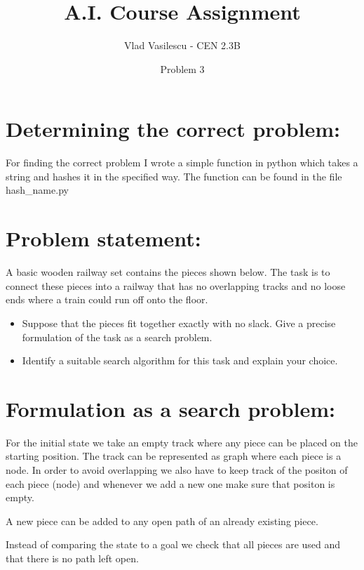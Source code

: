 \documentclass[a4paper, 12pt]{article}
\title{A.I. Course Assignment}
\author{Vlad Vasilescu - CEN 2.3B}
\date{Problem 3}
\begin{document}
\maketitle

\section*{Determining the correct problem:}
For finding the correct problem I wrote a simple function in python which takes a string and hashes it
in the specified way. The function can be found in the file hash\_name.py

\section*{Problem statement:}
A basic wooden railway set contains the pieces shown below. The task is to connect these pieces into a railway
that has no overlapping tracks and no loose ends where a train could run off onto the floor. \par
\begin{itemize}
    \item Suppose that the pieces fit together exactly with no slack. Give a precise formulation of the task
    as a search problem.
    \item Identify a suitable search algorithm for this task and explain your choice.
\end{itemize}

\section*{Formulation as a search problem:}
For the initial state we take an empty track where any piece can be placed on the starting position. The track
can be represented as graph where each piece is a node. In order to avoid overlapping we also have to keep track
of the positon of each piece (node) and whenever we add a new one make sure that positon is empty. \par
A new piece can be added to any open path of an already existing piece. \par
Instead of comparing the state to a goal we check that all pieces are used and that there is no path left open.
\end{document}
